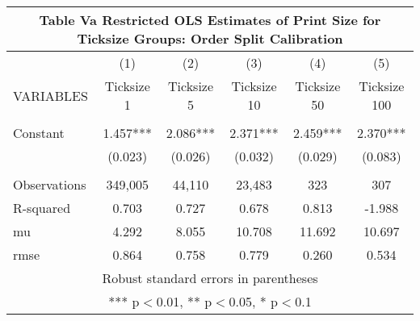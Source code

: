 \documentclass[]{article}
\begin{document}
\begin{tabular}{lccccc}
\multicolumn{6}{c}{Table Va Restricted OLS Estimates of Print Size for Ticksize Groups: Order Split Calibration} \\ \hline
 & (1) & (2) & (3) & (4) & (5) \\
VARIABLES & Ticksize 1 & Ticksize 5 & Ticksize 10 & Ticksize 50 & Ticksize 100 \\ \hline
 &  &  &  &  &  \\
Constant & 1.457*** & 2.086*** & 2.371*** & 2.459*** & 2.370*** \\
 & (0.023) & (0.026) & (0.032) & (0.029) & (0.083) \\
 &  &  &  &  &  \\
Observations & 349,005 & 44,110 & 23,483 & 323 & 307 \\
R-squared & 0.703 & 0.727 & 0.678 & 0.813 & -1.988 \\
mu & 4.292 & 8.055 & 10.708 & 11.692 & 10.697 \\
 rmse & 0.864 & 0.758 & 0.779 & 0.260 & 0.534 \\ \hline
\multicolumn{6}{c}{ Robust standard errors in parentheses} \\
\multicolumn{6}{c}{ *** p$<$0.01, ** p$<$0.05, * p$<$0.1} \\
\end{tabular}
\end{document}
